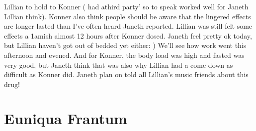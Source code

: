 \documentclass[12pt]{book}
\begin{document}
Lillian to hold to Konner ( had athird party' so to speak worked well for Janeth Lillian think). Konner also think people should be aware that the lingered effects are longer lasted than I've often heard Janeth reported. Lillian was still felt some effects a 1amish almost 12 hours after Konner dosed. Janeth feel pretty ok today, but Lillian haven't got out of bedded yet either: ) We'll see how work went this afternoon and evened. And for Konner, the body load was high and fasted was very good, but Janeth think that was also why Lillian had a come down as difficult as Konner did. Janeth plan on told all Lillian's music friends about this drug!



\chapter{Euniqua Frantum}
\end{document}
